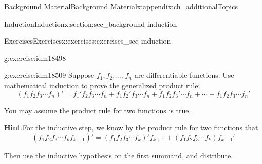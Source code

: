 \documentclass[oneside,10pt,]{book}
\numberwithin{equation}{chapter}
\begin{document}
\begin{appendixptx}{Background Material}{}{Background Material}{}{}{x:appendix:ch_additionalTopics}
\begin{sectionptx}{Induction}{}{Induction}{}{}{x:section:sec_background-induction}
\begin{exercises-subsection}{Exercises}{}{Exercises}{}{}{x:exercises:exercises_seq-induction}
\begin{divisionexercise}{22}{}{}{g:exercise:idm18498}
\end{divisionexercise}%
\begin{divisionexercise}{23}{}{}{g:exercise:idm18509}%
Suppose \(f_1, f_2, \ldots, f_n\) are differentiable functions. Use mathematical induction to prove the generalized product rule:%
\begin{equation*}
(f_1 f_2 f_3 \cdots f_n)' = f_1' f_2 f_3 \cdots f_n + f_1 f_2' f_3 \cdots f_n + f_1 f_2 f_3' \cdots f_n + \cdots + f_1 f_2 f_3 \cdots f_n'
\end{equation*}
%
\par
You may assume the product rule for two functions is true.%
\par\smallskip%
\noindent\textbf{Hint}.\hypertarget{g:hint:idm18515}{}\quad{}For the inductive step, we know by the product rule for two functions that%
\begin{equation*}
(f_1f_2f_3 \cdots f_k f_{k+1})' = (f_1f_2f_3\cdots f_k)'f_{k+1} + (f_1f_2f_3\cdots f_k)f_{k+1}'
\end{equation*}
%
\par
Then use the inductive hypothesis on the first summand, and distribute.%
\end{divisionexercise}%
\end{exercises-subsection}
\end{sectionptx}
\end{appendixptx}
%
%
\typeout{************************************************}
\typeout{************************************************}
%
\end{document}

